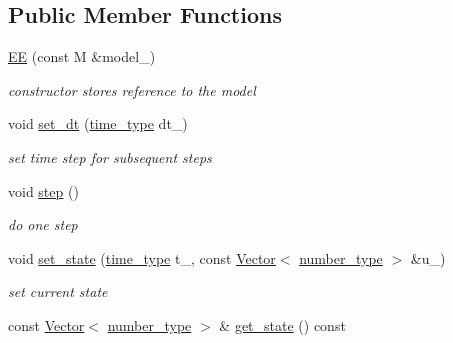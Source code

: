\subsection*{Public Member Functions}
\begin{DoxyCompactItemize}
\item 
\hypertarget{classhdnum_1_1EE_a1121f4c7c4ba2baa9afefc19c1a4dbcf}{
\hyperlink{classhdnum_1_1EE_a1121f4c7c4ba2baa9afefc19c1a4dbcf}{EE} (const M \&model\_\-)}
\label{classhdnum_1_1EE_a1121f4c7c4ba2baa9afefc19c1a4dbcf}

\begin{DoxyCompactList}\small\item\em constructor stores reference to the model \item\end{DoxyCompactList}\item 
\hypertarget{classhdnum_1_1EE_a9da0d16e937e3b42bd4385c082909986}{
void \hyperlink{classhdnum_1_1EE_a9da0d16e937e3b42bd4385c082909986}{set\_\-dt} (\hyperlink{classhdnum_1_1EE_a812a3ec962aa0b2924e30830828bf306}{time\_\-type} dt\_\-)}
\label{classhdnum_1_1EE_a9da0d16e937e3b42bd4385c082909986}

\begin{DoxyCompactList}\small\item\em set time step for subsequent steps \item\end{DoxyCompactList}\item 
\hypertarget{classhdnum_1_1EE_a6de0fb361be627ec08bceba734bf2971}{
void \hyperlink{classhdnum_1_1EE_a6de0fb361be627ec08bceba734bf2971}{step} ()}
\label{classhdnum_1_1EE_a6de0fb361be627ec08bceba734bf2971}

\begin{DoxyCompactList}\small\item\em do one step \item\end{DoxyCompactList}\item 
\hypertarget{classhdnum_1_1EE_a9011390335a5c147590c55efb1200b80}{
void \hyperlink{classhdnum_1_1EE_a9011390335a5c147590c55efb1200b80}{set\_\-state} (\hyperlink{classhdnum_1_1EE_a812a3ec962aa0b2924e30830828bf306}{time\_\-type} t\_\-, const \hyperlink{classhdnum_1_1Vector}{Vector}$<$ \hyperlink{classhdnum_1_1EE_a1ef3f42ee12273be741369aa6fd198cd}{number\_\-type} $>$ \&u\_\-)}
\label{classhdnum_1_1EE_a9011390335a5c147590c55efb1200b80}

\begin{DoxyCompactList}\small\item\em set current state \item\end{DoxyCompactList}\item 
\hypertarget{classhdnum_1_1EE_afeb12f7335aab6942ce190256c4982a5}{
const \hyperlink{classhdnum_1_1Vector}{Vector}$<$ \hyperlink{classhdnum_1_1EE_a1ef3f42ee12273be741369aa6fd198cd}{number\_\-type} $>$ \& \hyperlink{classhdnum_1_1EE_afeb12f7335aab6942ce190256c4982a5}{get\_\-state} () const }
\label{classhdnum_1_1EE_afeb12f7335aab6942ce190256c4982a5}


\end{DoxyCompactItemize}
